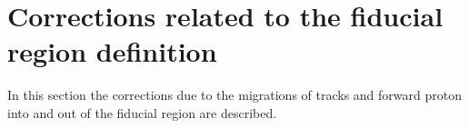\section{Corrections related to the fiducial region definition}\label{section:star_migrations}
In this section the corrections due to the migrations of tracks and forward proton into and out of the fiducial region  are described.






